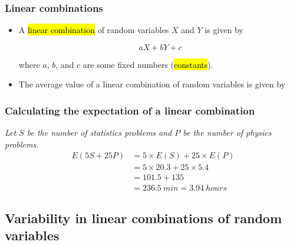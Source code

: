 \documentclass[slidestop,compress,mathserif]{beamer}
\newcommand{\soln}[1]{\textit{#1}}
\begin{document}

\begin{frame}
\frametitle{Linear combinations}

\begin{itemize}

\item A \hl{linear combination} of random variables $X$ and $Y$ is given by

\[ aX + bY + c\]

where $a$, $b$, and $c$ are some fixed numbers (\hl{constants}).

\pause

\item The average value of a linear combination of random variables is given by
\formula{\[ E(aX + bY + c) = a \times E(X) + b \times E(Y) + c\]}

\end{itemize}

\end{frame}


\begin{frame}
\frametitle{Calculating the expectation of a linear combination}


\soln{
\pause
Let $S$ be the number of statistics problems and $P$ be the number of physics problems. 
\pause
\begin{align*} 
E(5S+25P) &= 5 \times E(S) + 25 \times E(P) \\
&= 5 \times 20.3 + 25 \times 5.4 \\
&= 101.5 + 135 \\
&= 236.5~min = 3.94~hours
\end{align*}
}

\end{frame}


\subsection{Variability in linear combinations of random variables}

\end{document}
